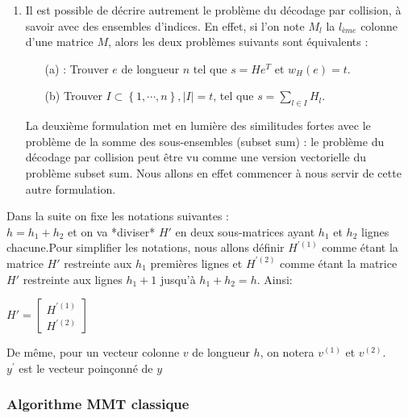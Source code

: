 \documentclass[12pt,openany]{report}
\begin{document}
\begin{enumerate}
\begin{figure}[htp]
\end{figure}


\item Il est possible de décrire autrement le problème du décodage par collision,
à savoir avec des ensembles d’indices. En effet, si l’on note $M_l$ la $l_{ème}$ colonne d’une matrice $M$, alors les deux problèmes suivants sont équivalents :
\begin{itemize}
\item[(a)]: Trouver $e$ de longueur $n$ tel que $s=He^{T}  $ et $w_H(e)=t $.
\item[(b)] Trouver $ I \subset \left\lbrace 1,\cdots ,n\right\rbrace  , \mid I \mid =t$, tel que $s=\sum_{l \in I}H_l  $.

\end{itemize}
La deuxième formulation met en lumière des similitudes fortes avec le problème de la somme des sous-ensembles (subset sum) : le problème du décodage par collision peut être vu comme une version vectorielle du problème subset sum. Nous allons en effet commencer à nous servir de cette autre formulation.



\end{enumerate}


Dans la suite on fixe les notations suivantes :\\
$h=h_1 +h_2  $ et on va *diviser* $\mathit{H'} $ en deux sous-matrices ayant $h_1 $ et $h_2 $ lignes chacune.Pour simplifier les notations, nous allons définir $ \mathit{H}^{'(1)} $ comme étant la matrice $\mathit{H'} $ restreinte aux $h_1 $ premières lignes et $ \mathit{H^{'(2)}} $ comme étant la matrice $\mathit{H'} $ restreinte aux lignes $ h_1 +1 $ jusqu'à $h_1 + h_2=h $. Ainsi:
\begin{center}


$  
\mathit{H'}=\begin{bmatrix}
\mathit{H}^{'(1)}\\
\mathit{H}^{'(2)}
\end{bmatrix}
$
\end{center}
De même, pour un vecteur colonne $v$ de longueur $h$, on notera $v^{(1)}$ et $v^{(2)}$.\\
$y^{'} $ est le vecteur poinçonné de $y$





\subsubsection*{Algorithme MMT classique}
\end{document}
